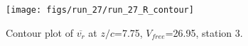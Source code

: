 \begin{figure}[H]
\centering
\texttt{[image: figs/run\_27/run\_27\_R\_contour]}
\caption{Contour plot of $\overline{v_{r}}$ at $z/c$=7.75, $V_{free}$=26.95, station 3.}
\label{fig:run_27_R_contour}
\end{figure}


